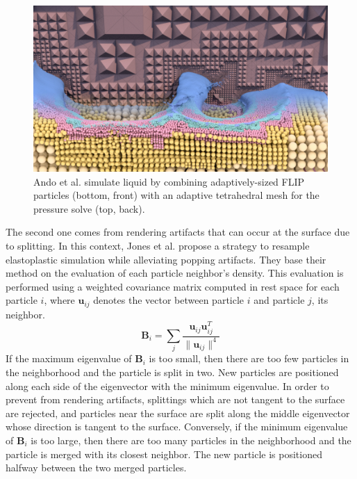 \begin{figure}[t]
\centering
\includegraphics[width=\linewidth]{images/starAdaptivity-cgf2016/Ando2013_3.png}
\caption{Ando et al. \cite{Ando2013} simulate liquid by combining adaptively-sized FLIP particles (bottom, front) with an adaptive tetrahedral mesh for the pressure solve (top, back).}
\label{fig:Ando2013}
\end{figure}

The second one comes from rendering artifacts that can occur at the surface due to splitting. In this context, Jones et al. \cite{Jones:2014:DEF} propose a strategy to resample elastoplastic simulation while alleviating popping artifacts. They base their method on the evaluation of each particle neighbor's density. This evaluation is performed using a weighted covariance matrix computed in rest space for each particle $i$, where $\mathbf{u}_{ij}$ denotes the vector between particle $i$ and particle $j$, its neighbor.
\begin{equation}
\label{eq:jones_resampling}
\mathbf{B}_{i} = \sum_{j}  \frac{\mathbf{u}_{ij}\mathbf{u}_{ij}^{T}}{\| \mathbf{u}_{ij} \|^{4}}
\end{equation}
If the maximum eigenvalue of $\mathbf{B}_{i}$ is too small, then there are too few particles in the neighborhood and the particle is split in two. New particles are positioned along each side of the eigenvector with the minimum eigenvalue. In order to prevent from rendering artifacts, splittings which are not tangent to the surface are rejected, and particles near the surface are split along the middle eigenvector whose direction is tangent to the surface. Conversely, if the minimum eigenvalue of $\mathbf{B}_{i}$ is too large, then there are too many particles in the neighborhood and the particle is merged with its closest neighbor. The new particle is positioned halfway between the two merged particles.

